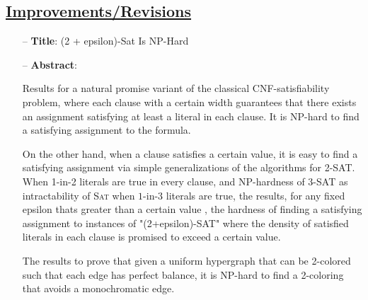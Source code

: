 \documentclass[11pt,twocolumn]{article}
\begin{document}
\subsection {\underline{Improvements/Revisions}}
\begin{itemize} 
	\item[--] {\bf{Title}}: (2 + epsilon)-Sat Is NP-Hard
	\item[--] {\bf{Abstract}}:

Results for a natural promise variant of the classical CNF-satisfiability problem, where each clause with a certain width guarantees that there exists an assignment satisfying at least a literal in each clause. It is NP-hard to find a satisfying assignment to the formula.

On the other hand, when a clause satisfies a certain value, it is easy to find a satisfying assignment via simple generalizations of the algorithms for 2-SAT. When 1-in-2 literals are true in every clause, and NP-hardness of 3-SAT as intractability of \textsc{Sat} when $1$-in-$3$ literals are true, the results, for any fixed epsilon thats greater than a certain value , the hardness of finding a satisfying assignment to instances of "(2+epsilon)-SAT" where the density of satisfied literals in each clause is promised to exceed a certain value.

The results to prove that given a uniform hypergraph that can be 2-colored such that each edge has perfect balance, it is NP-hard to find a 2-coloring that avoids a monochromatic edge. \cite{NP}

\end{itemize}




 
\end{document}
